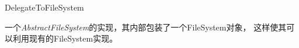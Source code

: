\begin{XeClass}{DelegateToFileSystem}
   
 一个\emph{AbstractFileSystem}的实现，其内部包装了一个FileSystem对象，
 这样使其可以利用现有的FileSystem实现。

\end{XeClass}
